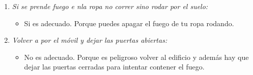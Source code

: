 \documentclass{article}
\begin{document}
\begin{enumerate}[label=(\alph*)]
\begin{itemize}
            \end{itemize}
          \item \textit{Si se prende fuego e nla ropa no correr sino rodar por el suelo:}
            \begin{itemize}
              \item Si es adecuado. Porque puedes apagar el fuego de tu ropa rodando.
            \end{itemize}
          \item \textit{Volver a por el móvil y dejar las puertas abiertas:}
            \begin{itemize}
              \item No es adecuado. Porque es peligroso volver al edificio y además hay que dejar las puertas cerradas para intentar contener el fuego.
            \end{itemize}
        \end{enumerate}
\end{document}
